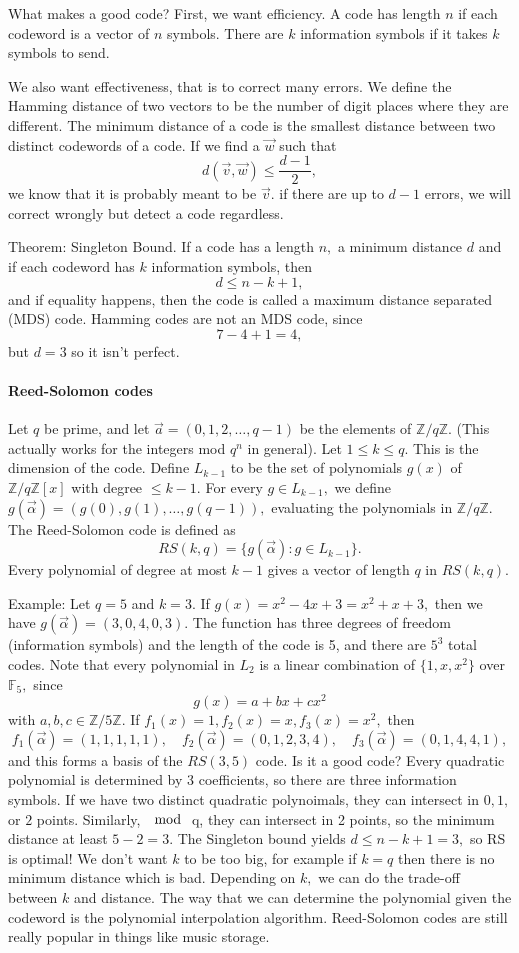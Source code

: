 \documentclass[12pt]{article}
\begin{document}
What makes a good code?
First, we want efficiency. A code has length $n$ if each codeword is a vector of $n$ symbols. There are $k$ information symbols if it takes $k$ symbols to send.

We also want effectiveness, that is to correct many errors. We define the Hamming distance of two vectors to be the number of digit places where they are different. The minimum distance of a code is the smallest distance between two distinct codewords of a code. If we find a $\vec{w}$ such that
\[d(\vec{v},\vec{w})\le \frac{d-1}{2},\] we know that it is probably meant to be $\vec{v}.$ if there are up to $d-1$ errors, we will correct wrongly but detect a code regardless.

Theorem: Singleton Bound. If a code has a length $n,$ a minimum distance $d$ and if each codeword has $k$ information symbols, then
\[d\le n-k+1,\] and if equality happens, then the code is called a maximum distance separated (MDS) code. Hamming codes are not an MDS code, since 
\[7-4+1=4,\] but $d=3$ so it isn't perfect.

\paragraph{Reed-Solomon codes}
Let $q$ be prime, and let $\vec{a}=(0,1,2,\dots,q-1)$ be the elements of $\mathbb{Z}/q\mathbb{Z}.$ (This actually works for the integers mod $q^n$ in general). Let $1\le k\le q.$ This is the dimension of the code. Define $L_{k-1}$ to be the set of polynomials $g(x)$ of $\mathbb{Z}/q\mathbb{Z}[x]$ with degree $\le k-1.$ For every $g\in L_{k-1},$ we define $g(\vec{\alpha})=(g(0),g(1),\dots,g(q-1)),$ evaluating the polynomials in $\mathbb{Z}/q\mathbb{Z}.$ The Reed-Solomon code is defined as
\[RS(k,q)=\{g(\vec{\alpha}):g\in L_{k-1}\}.\] Every polynomial of degree at most $k-1$ gives a vector of length $q$ in $RS(k,q).$

Example:
Let $q=5$ and $k=3.$ If $g(x)=x^2-4x+3=x^2+x+3,$ then we have $g(\vec\alpha)=(3,0,4,0,3).$ The function has three degrees of freedom (information symbols) and the length of the code is 5, and there are $5^3$ total codes. Note that every polynomial in $L_2$ is a linear combination of $\{1,x,x^2\}$ over $\mathbb{F}_5,$ since
\[g(x)=a+bx+cx^2\]
with $a,b,c\in\mathbb{Z}/5\mathbb{Z}.$ If $f_1(x)=1,f_2(x)=x,f_3(x)=x^2,$
then
\[f_1(\vec{\alpha})=(1,1,1,1,1), \quad f_2(\vec{\alpha})=(0,1,2,3,4), \quad f_3(\vec{\alpha})=(0,1,4,4,1),\] and this forms a basis of the $RS(3,5)$ code. Is it a good code? Every quadratic polynomial is determined by 3 coefficients, so there are three information symbols. If we have two distinct quadratic polynoimals, they can intersect in $0,1,$ or $2$ points. Similarly, $\mod$ q, they can intersect in 2 points, so the minimum distance at least $5-2=3.$ The Singleton bound yields $d\le n-k+1=3,$ so RS is optimal! We don't want $k$ to be too big, for example if $k=q$ then there is no minimum distance which is bad. Depending on $k,$ we can do the trade-off between $k$ and distance. The way that we can determine the polynomial given the codeword is the polynomial interpolation algorithm. Reed-Solomon codes are still really popular in things like music storage.
\end{document}
